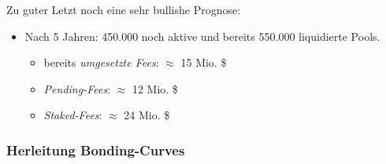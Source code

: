 \begin{Fazit}
\vspace{0.5cm}

Zu guter Letzt noch eine sehr bullishe Prognose:

\begin{itemize}
	\item Nach 5 Jahren: 450.000 noch aktive und bereits 550.000 liquidierte Pools.
	\begin{itemize}
		\item bereits \textit{umgesetzte Fees}: $\approx$ 15 Mio. \$ 
		\item \textit{Pending-Fees}: $\approx$ 12 Mio. \$ 
		\item \textit{Staked-Fees}: $\approx$ 24 Mio. \$ 
	\end{itemize}	 
\end{itemize}

\end{Fazit}

\vspace{0.5cm}




\vspace{0.5cm}

\subsubsection{Herleitung Bonding-Curves}
\vspace{0.2cm}


\vspace{0.3cm}

